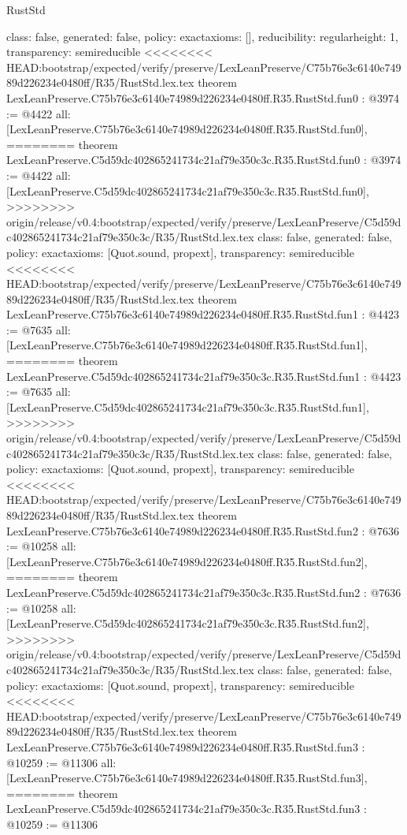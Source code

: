 \begin{lexlean}{RustStd}
\begin{coremodule}
{\begin{coremodule}
{{{  class: false,
  generated: false,
  policy: exact{axioms: []},
  reducibility: regular{height: 1},
  transparency: semireducible
}
<<<<<<<< HEAD:bootstrap/expected/verify/preserve/LexLeanPreserve/C75b76e3c6140e74989d226234e0480ff/R35/RustStd.lex.tex
theorem LexLeanPreserve.C75b76e3c6140e74989d226234e0480ff.R35.RustStd.fun0 : @3974 := @4422 {
  all: [LexLeanPreserve.C75b76e3c6140e74989d226234e0480ff.R35.RustStd.fun0],
========
theorem LexLeanPreserve.C5d59dc402865241734c21af79e350c3c.R35.RustStd.fun0 : @3974 := @4422 {
  all: [LexLeanPreserve.C5d59dc402865241734c21af79e350c3c.R35.RustStd.fun0],
>>>>>>>> origin/release/v0.4:bootstrap/expected/verify/preserve/LexLeanPreserve/C5d59dc402865241734c21af79e350c3c/R35/RustStd.lex.tex
  class: false,
  generated: false,
  policy: exact{axioms: [Quot.sound, propext]},
  transparency: semireducible
}
<<<<<<<< HEAD:bootstrap/expected/verify/preserve/LexLeanPreserve/C75b76e3c6140e74989d226234e0480ff/R35/RustStd.lex.tex
theorem LexLeanPreserve.C75b76e3c6140e74989d226234e0480ff.R35.RustStd.fun1 : @4423 := @7635 {
  all: [LexLeanPreserve.C75b76e3c6140e74989d226234e0480ff.R35.RustStd.fun1],
========
theorem LexLeanPreserve.C5d59dc402865241734c21af79e350c3c.R35.RustStd.fun1 : @4423 := @7635 {
  all: [LexLeanPreserve.C5d59dc402865241734c21af79e350c3c.R35.RustStd.fun1],
>>>>>>>> origin/release/v0.4:bootstrap/expected/verify/preserve/LexLeanPreserve/C5d59dc402865241734c21af79e350c3c/R35/RustStd.lex.tex
  class: false,
  generated: false,
  policy: exact{axioms: [Quot.sound, propext]},
  transparency: semireducible
}
<<<<<<<< HEAD:bootstrap/expected/verify/preserve/LexLeanPreserve/C75b76e3c6140e74989d226234e0480ff/R35/RustStd.lex.tex
theorem LexLeanPreserve.C75b76e3c6140e74989d226234e0480ff.R35.RustStd.fun2 : @7636 := @10258 {
  all: [LexLeanPreserve.C75b76e3c6140e74989d226234e0480ff.R35.RustStd.fun2],
========
theorem LexLeanPreserve.C5d59dc402865241734c21af79e350c3c.R35.RustStd.fun2 : @7636 := @10258 {
  all: [LexLeanPreserve.C5d59dc402865241734c21af79e350c3c.R35.RustStd.fun2],
>>>>>>>> origin/release/v0.4:bootstrap/expected/verify/preserve/LexLeanPreserve/C5d59dc402865241734c21af79e350c3c/R35/RustStd.lex.tex
  class: false,
  generated: false,
  policy: exact{axioms: [Quot.sound, propext]},
  transparency: semireducible
}
<<<<<<<< HEAD:bootstrap/expected/verify/preserve/LexLeanPreserve/C75b76e3c6140e74989d226234e0480ff/R35/RustStd.lex.tex
theorem LexLeanPreserve.C75b76e3c6140e74989d226234e0480ff.R35.RustStd.fun3 : @10259 := @11306 {
  all: [LexLeanPreserve.C75b76e3c6140e74989d226234e0480ff.R35.RustStd.fun3],
========
theorem LexLeanPreserve.C5d59dc402865241734c21af79e350c3c.R35.RustStd.fun3 : @10259 := @11306 {
}}}}}}}
\end{coremodule}}
\end{coremodule}
\end{lexlean}
